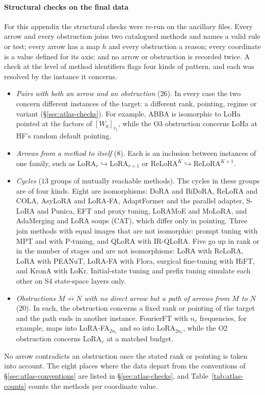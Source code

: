 \paragraph{Structural checks on the final data}
For this appendix the structural checks were re-run on the ancillary files. Every arrow and every obstruction joins two
catalogued methods and names a valid rule or test; every arrow has a map $h$ and every obstruction a reason; every
coordinate is a value defined for its axis; and no arrow or obstruction is recorded twice. A check at the level of method
identifiers flags four kinds of pattern, and each was resolved by the instance it concerns.
\begin{itemize}
  \item \emph{Pairs with both an arrow and an obstruction} ($26$). In every case the two concern different instances of
  the target: a different rank, pointing, regime or variant (\S\ref{sec:atlas-checks}). For example, ABBA is isomorphic
  to LoHa pointed at the factors of $[W_0]_{r_1}$, while the O3 obstruction concerns LoHa at HF's random default
  pointing.
  \item \emph{Arrows from a method to itself} ($8$). Each is an inclusion between instances of one family, such as
  LoRA$_r\hookrightarrow{}$LoRA$_{r+1}$ or ReLoRA$^K\hookrightarrow{}$ReLoRA$^{K+1}$.
  \item \emph{Cycles} ($13$ groups of mutually reachable methods). The cycles in these groups are of four kinds.
  Eight are isomorphisms: DoRA and BiDoRA, ReLoRA and COLA, AsyLoRA and LoRA-FA, AdaptFormer and the parallel adapter,
  S-LoRA and Punica, EFT and proxy tuning, LoRAMoE and MoLoRA, and AdaMerging and LoRA soups (CAT), which differ only in
  pointing. Three join methods with equal images that are not isomorphic: prompt tuning with MPT and with P-tuning, and
  QLoRA with IR-QLoRA. Five go up in rank or in the number of stages and are not isomorphisms: LoRA with ReLoRA, LoRA
  with PEANuT, LoRA-FA with Flora, surgical fine-tuning with HiFT, and KronA with LoKr. Initial-state tuning and prefix
  tuning simulate each other on S4 state-space layers only.
  \item \emph{Obstructions $M\not\to N$ with no direct arrow but a path of arrows from $M$ to $N$} ($20$). In each,
  the obstruction concerns a fixed rank or
  pointing of the target and the path ends in another instance. FourierFT with $n_c$ frequencies, for example, maps
  into LoRA-FA$_{2n_c}$ and so into LoRA$_{2n_c}$, while the O2 obstruction concerns LoRA$_r$ at a matched budget.
\end{itemize}
No arrow contradicts an obstruction once the stated rank or pointing is taken into account. The eight places where the
data depart from the conventions of \S\ref{sec:atlas-conventions} are listed in \S\ref{sec:atlas-checks}, and
Table~\ref{tab:atlas-counts} counts the methods per coordinate value.

